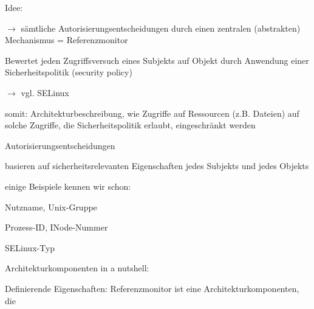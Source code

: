 \documentclass[a4paper]{article}
\begin{document}
\begin{multicols}{3}
    \begin{itemize*}
        \item
        Idee:
        \begin{itemize*}
            \item $\rightarrow$ sämtliche Autorisierungsentscheidungen durch einen zentralen (abstrakten) Mechanismus = Referenzmonitor
            \item Bewertet jeden Zugriffsversuch eines Subjekts auf Objekt durch Anwendung einer Sicherheitspolitik (security policy) \begin{itemize*} \item $\rightarrow$ vgl. SELinux \end{itemize*}
            \item somit: Architekturbeschreibung, wie Zugriffe auf Ressourcen (z.B. Dateien) auf solche Zugriffe, die Sicherheitspolitik erlaubt, eingeschränkt werden
        \end{itemize*}
        \item
        Autorisierungsentscheidungen
        \begin{itemize*}
            \item basieren auf sicherheitsrelevanten Eigenschaften jedes Subjekts und jedes Objekts
            \item einige Beispiele kennen wir schon: \begin{itemize*} \item Nutzname, Unix-Gruppe \item Prozess-ID, INode-Nummer \item SELinux-Typ \end{itemize*}
        \end{itemize*}
        \item
        Architekturkomponenten in a nutshell:
    \end{itemize*}

    Definierende Eigenschaften: Referenzmonitor ist eine
    Architekturkomponenten, die


\end{multicols}
\end{document}
